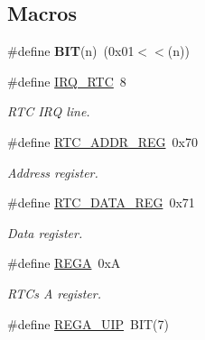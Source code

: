 \subsection*{Macros}
\begin{DoxyCompactItemize}
\item 
\hypertarget{group__rtcmacro_ga3a8ea58898cb58fc96013383d39f482c}{}\label{group__rtcmacro_ga3a8ea58898cb58fc96013383d39f482c} 
\#define {\bfseries B\+IT}(n)~(0x01$<$$<$(n))
\item 
\hypertarget{group__rtcmacro_ga910ac5f2c1b4016e433f9832358a1816}{}\label{group__rtcmacro_ga910ac5f2c1b4016e433f9832358a1816} 
\#define \hyperlink{group__rtcmacro_ga910ac5f2c1b4016e433f9832358a1816}{I\+R\+Q\+\_\+\+R\+TC}~8
\begin{DoxyCompactList}\small\item\em R\+TC I\+RQ line. \end{DoxyCompactList}\item 
\hypertarget{group__rtcmacro_ga710b98232df2c563009e6f8a6cd18220}{}\label{group__rtcmacro_ga710b98232df2c563009e6f8a6cd18220} 
\#define \hyperlink{group__rtcmacro_ga710b98232df2c563009e6f8a6cd18220}{R\+T\+C\+\_\+\+A\+D\+D\+R\+\_\+\+R\+EG}~0x70
\begin{DoxyCompactList}\small\item\em Address register. \end{DoxyCompactList}\item 
\hypertarget{group__rtcmacro_ga2f258a00c59c3f347c8d2d4a75471ce0}{}\label{group__rtcmacro_ga2f258a00c59c3f347c8d2d4a75471ce0} 
\#define \hyperlink{group__rtcmacro_ga2f258a00c59c3f347c8d2d4a75471ce0}{R\+T\+C\+\_\+\+D\+A\+T\+A\+\_\+\+R\+EG}~0x71
\begin{DoxyCompactList}\small\item\em Data register. \end{DoxyCompactList}\item 
\hypertarget{group__rtcmacro_ga871557447a6fe92581aa4905362f3526}{}\label{group__rtcmacro_ga871557447a6fe92581aa4905362f3526} 
\#define \hyperlink{group__rtcmacro_ga871557447a6fe92581aa4905362f3526}{R\+E\+GA}~0xA
\begin{DoxyCompactList}\small\item\em R\+TC\textquotesingle{}s A register. \end{DoxyCompactList}\item 
\hypertarget{group__rtcmacro_gaa89223a2f0da3d2d0ef8a414a34ed3e6}{}\label{group__rtcmacro_gaa89223a2f0da3d2d0ef8a414a34ed3e6} 
\#define \hyperlink{group__rtcmacro_gaa89223a2f0da3d2d0ef8a414a34ed3e6}{R\+E\+G\+A\+\_\+\+U\+IP}~B\+IT(7)
$$
\end{DoxyCompactItemize}
